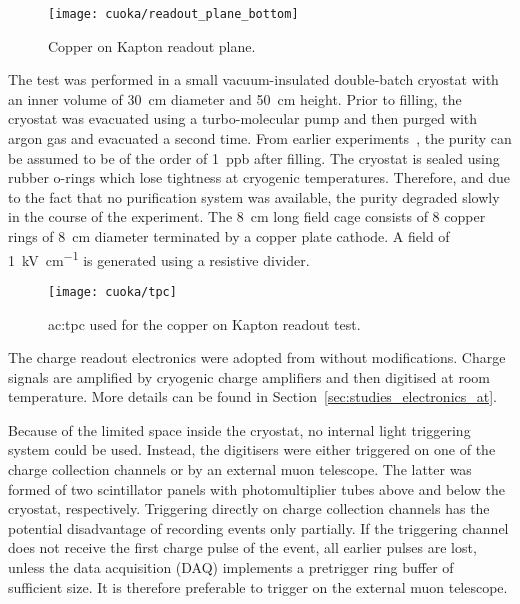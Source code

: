 \begin{figure}[htb]
	\centering
	\texttt{[image: cuoka/readout\_plane\_bottom]}
	\caption{Copper on Kapton readout plane.}
	\label{fig:cuoka_readout-plane}
\end{figure}

The test was performed in a small vacuum-insulated double-batch cryostat with an inner volume of \SI{30}{\centi\metre} diameter and \SI{50}{\centi\metre} height.
Prior to filling, the cryostat was evacuated using a turbo-molecular pump and then purged with argon gas and evacuated a second time.
From earlier experiments~\cite{2photonAbs}, the purity can be assumed to be of the order of \SI{1}{ppb} after filling.
The cryostat is sealed using rubber o-rings which lose tightness at cryogenic temperatures.
Therefore, and due to the fact that no purification system was available, the purity degraded slowly in the course of the experiment.
The \SI{8}{\centi\metre} long field cage consists of \num{8} copper rings of \SI{8}{\centi\metre} diameter terminated by a copper plate cathode.
A field of \SI{1}{\kilo\volt\per\centi\metre} is generated using a resistive divider.

\begin{figure}[htb]
	\centering
	\texttt{[image: cuoka/tpc]}
	\caption{\gls{ac:tpc} used for the copper on Kapton readout test.}
	\label{fig:cuoka_tpc}
\end{figure}

The charge readout electronics were adopted from \AT{} without modifications.
Charge signals are amplified by cryogenic charge amplifiers and then digitised at room temperature.
More details can be found in Section~\ref{sec:studies_electronics_at}.

Because of the limited space inside the cryostat, no internal light triggering system could be used.
Instead, the digitisers were either triggered on one of the charge collection channels or by an external muon telescope.
The latter was formed of two scintillator panels with photomultiplier tubes above and below the cryostat, respectively.
Triggering directly on charge collection channels has the potential disadvantage of recording events only partially.
If the triggering channel does not receive the first charge pulse of the event, all earlier pulses are lost, unless the data acquisition (DAQ) implements a pretrigger ring buffer of sufficient size.
It is therefore preferable to trigger on the external muon telescope.

